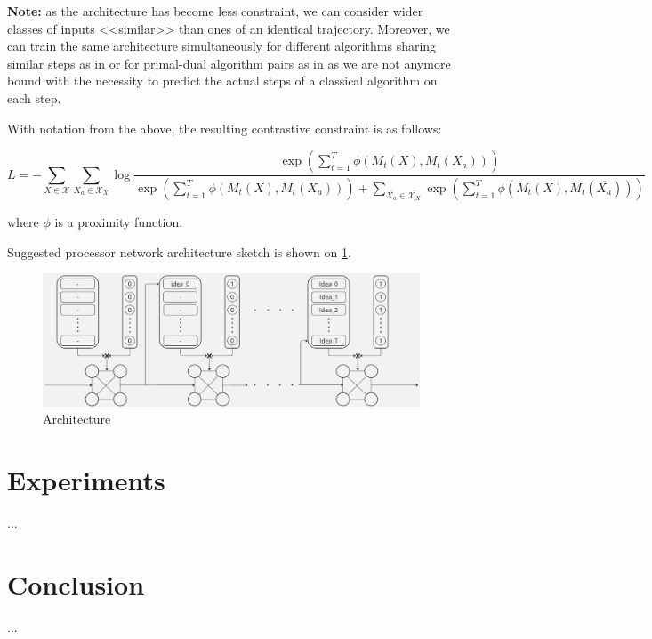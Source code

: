 \documentclass{article}
\begin{document}
\textbf{Note:} as the architecture has become less constraint, we can consider wider classes of inputs <<similar>>
 than ones of an identical trajectory. Moreover, we can train the same architecture simultaneously for different algorithms 
 sharing similar steps as in \cite{ibarz2022generalist} or for primal-dual algorithm pairs as in \cite{numeroso2023dual} as 
 we are not anymore bound with the necessity to predict the actual steps of a classical algorithm on each step.

With notation from the above, the resulting contrastive constraint is as follows:

$$L = - \sum_{X\in \mathcal{X}}\sum_{X_a \in \mathcal{X}_X}\log\frac{  \exp{\left(  \sum_{t=1}^{T} \phi\left(M_t(X), M_t(X_a)\right)  \right)}  }{  \exp{\left(  \sum_{t=1}^{T} \phi\left(M_t(X), M_t(X_a)\right)  \right)} + \sum\limits_{\overline{X_a}\in \overline{\mathcal{X}_X}}\exp{\left(\sum_{t=1}^{T}\phi\left(M_t(X), M_t(\overline{X_a})\right)\right)}  }$$

where $\phi$ is a proximity function.

Suggested processor network architecture sketch is shown on \ref{fig1}.

\begin{figure}[h!]
    \centering
        \includegraphics[scale=0.35]{../pictures/extra-ARM-GNN.png}
    \caption{Architecture}
    \label{fig1}
\end{figure}

\section{Experiments}
    ... 
\section{Conclusion}
    ...






\end{document}
